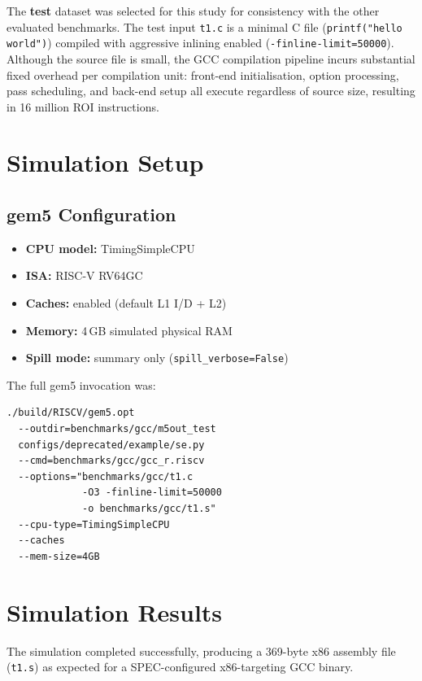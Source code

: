 \documentclass[conference]{IEEEtran}
\begin{document}
The \textbf{test} dataset was selected for this study for consistency
with the other evaluated benchmarks. The test input \texttt{t1.c} is a
minimal C file (\texttt{printf("hello world")}) compiled with
aggressive inlining enabled (\texttt{-finline-limit=50000}).
Although the source file is small, the GCC compilation pipeline incurs
substantial fixed overhead per compilation unit: front-end
initialisation, option processing, pass scheduling, and back-end
setup all execute regardless of source size, resulting in 16 million
ROI instructions.

\section{Simulation Setup}

\subsection{gem5 Configuration}

\begin{itemize}
    \item \textbf{CPU model:}   TimingSimpleCPU
    \item \textbf{ISA:}         RISC-V RV64GC
    \item \textbf{Caches:}      enabled (default L1 I/D + L2)
    \item \textbf{Memory:}      4\,GB simulated physical RAM
    \item \textbf{Spill mode:}  summary only (\texttt{spill\_verbose=False})
\end{itemize}

The full gem5 invocation was:

\begin{verbatim}
./build/RISCV/gem5.opt
  --outdir=benchmarks/gcc/m5out_test
  configs/deprecated/example/se.py
  --cmd=benchmarks/gcc/gcc_r.riscv
  --options="benchmarks/gcc/t1.c
             -O3 -finline-limit=50000
             -o benchmarks/gcc/t1.s"
  --cpu-type=TimingSimpleCPU
  --caches
  --mem-size=4GB
\end{verbatim}

\section{Simulation Results}

The simulation completed successfully, producing a 369-byte x86
assembly file (\texttt{t1.s}) as expected for a SPEC-configured
x86-targeting GCC binary.
\end{document}
